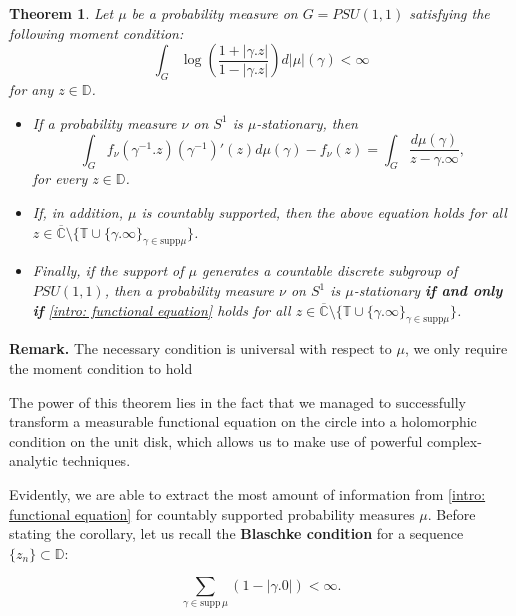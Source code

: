 \documentclass[11pt]{article}
\newtheorem{theorem}{Theorem}[section]
\begin{document}
\begin{theorem}
	\label{T:main result}
	Let $\mu$ be a probability measure on $G=PSU(1,1)$ satisfying the following moment condition:
	\begin{equation}
		\int_{G} \log\left( \frac{1 + |\gamma.z| }{1 - |\gamma.z|} \right)  d |\mu| (\gamma) < \infty
	\end{equation}
	for any $z \in \mathbb{D}$.	
	
	\begin{itemize}
		\item If a probability measure $\nu$ on $S^1$ is $\mu$-stationary, then
		\begin{equation}
			\label{intro: functional equation}
			\int_G f_\nu(\gamma^{-1}.z)(\gamma^{-1})'(z)  d\mu(\gamma) - f_\nu(z) = \int_G \frac{d \mu(\gamma)}{z - \gamma.\infty},
		\end{equation}
		for every $z \in \mathbb{D}$. 
		\item If, in addition, $\mu$ is countably supported, then the above equation holds for all \\ $z \in \overline{\mathbb{C}} \setminus \{ \mathbb{T} \cup \{ \gamma.\infty \}_{\gamma \in \text{supp} \mu } \}$.
		\item Finally, if the support of $\mu$ generates a countable discrete subgroup of $PSU(1,1)$, then a probability measure $\nu$ on $S^1$ is $\mu$-stationary \textbf{if and only if} \eqref{intro: functional equation} holds for all $z \in \overline{\mathbb{C}} \setminus \{ \mathbb{T} \cup \{ \gamma.\infty \}_{\gamma \in \text{supp} \mu } \}$.
	\end{itemize}
\end{theorem}

\textbf{Remark.} The necessary condition is universal with respect to $\mu$, we only require the moment condition to hold 

The power of this theorem lies in the fact that we managed to successfully transform a measurable functional equation on the circle into a holomorphic condition on the unit disk, which allows us to make use of powerful complex-analytic techniques.

Evidently, we are able to extract the most amount of information from \eqref{intro: functional equation} for countably supported probability measures $\mu$. Before stating the corollary, let us recall the \textbf{Blaschke condition} for a sequence $\{ z_n \} \subset \mathbb{D}$:

\begin{equation}
	\label{Blachke condition}
	\sum_{\gamma \in \text{supp} \, \mu} (1 - |\gamma.0|) < \infty.
\end{equation}
\end{document}
